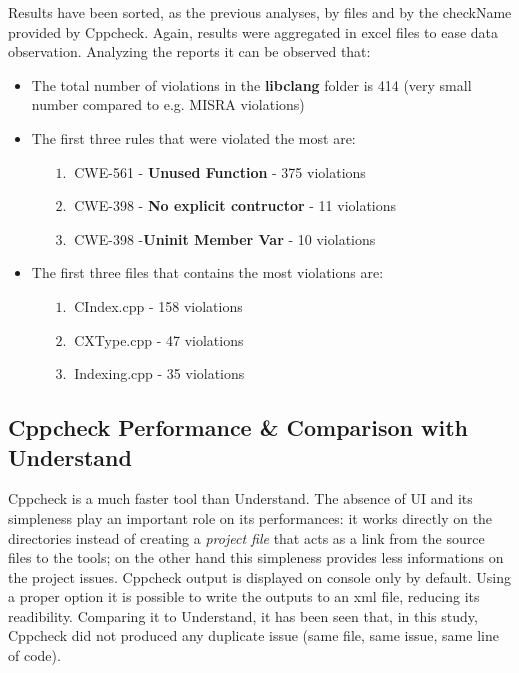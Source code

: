 Results have been sorted, as the previous analyses, by files and by the checkName provided by Cppcheck. Again, results were aggregated in excel files to ease data observation.\newline
Analyzing the reports it can be observed that:
\begin{itemize}
	\item The total number of violations in the \textbf{libclang} folder is 414 (very small number compared to e.g. MISRA violations)
	\item The first three rules that were violated the most are:
	\begin{itemize}
		\item[$1.\:$] CWE-561 - \textbf{Unused Function} - 375 violations
		\item[$2.\:$] CWE-398 - \textbf{No explicit contructor} - 11 violations
		\item[$3.\:$] CWE-398 -\textbf{Uninit Member Var} - 10 violations
	\end{itemize}
	\item The first three files that contains the most violations are:
		\begin{itemize}
		\item[$1.\:$] CIndex.cpp - 158 violations
		\item[$2.\:$] CXType.cpp - 47 violations
		\item[$3.\:$] Indexing.cpp - 35 violations
	\end{itemize}
\end{itemize}

\subsection{Cppcheck Performance \& Comparison with Understand}

Cppcheck is a much faster tool than Understand. The absence of UI and its simpleness play an important role on its performances: it works directly on the directories instead of creating a \textsl{project file} that acts as a link from the source files to the tools; on the other hand this simpleness provides less informations on the project issues.\newline
Cppcheck output is displayed on console only by default. Using a proper option it is possible to write the outputs to an xml file, reducing its readibility.\newline
Comparing it to Understand, it has been seen that, in this study, Cppcheck did not produced any duplicate issue (same file, same issue, same line of code).\newline\newline


